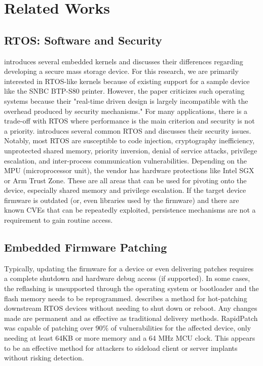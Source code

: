 \section{Related Works}

\subsection{RTOS: Software and Security}
\autocite{Benadjila2018WooKeyU} introduces several embedded kernels and discusses their differences regarding developing a secure mass storage device. For this research, we are primarily interested in RTOS-like kernels because of existing support for a sample device like the SNBC BTP-S80 printer. However, the paper criticizes such operating systems because their "real-time driven design is largely incompatible with the overhead produced by security mechanisms." For many applications, there is a trade-off with RTOS where performance is the main criterion and security is not a priority. \autocite{yuRealTimeOperatingSystem} introduces several common RTOS and discusses their security issues. Notably, most RTOS are susceptible to code injection, cryptography inefficiency, unprotected shared memory, priority inversion, denial of service attacks, privilege escalation, and inter-process communication vulnerabilities. Depending on the MPU (microprocessor unit), the vendor has hardware protections like Intel SGX or Arm Trust Zone. These are all areas that can be used for pivoting onto the device, especially shared memory and privilege escalation. If the target device firmware is outdated (or, even libraries used by the firmware) and there are known CVEs that can be repeatedly exploited, persistence mechanisms are not a requirement to gain routine access.

\subsection{Embedded Firmware Patching}
Typically, updating the firmware for a device or even delivering patches requires a complete shutdown and hardware debug access (if supported). In some cases, the reflashing is unsupported through the operating system or bootloader and the flash memory needs to be reprogrammed. \autocite{heRapidPatchFirmwareHotpatching2022} describes a method for hot-patching downstream RTOS devices without needing to shut down or reboot. Any changes made are permanent and as effective as traditional delivery methods. RapidPatch was capable of patching over 90\% of vulnerabilities for the affected device, only needing at least 64KB or more memory and a 64 MHz MCU clock. This appears to be an effective method for attackers to sideload client or server implants without risking detection.


